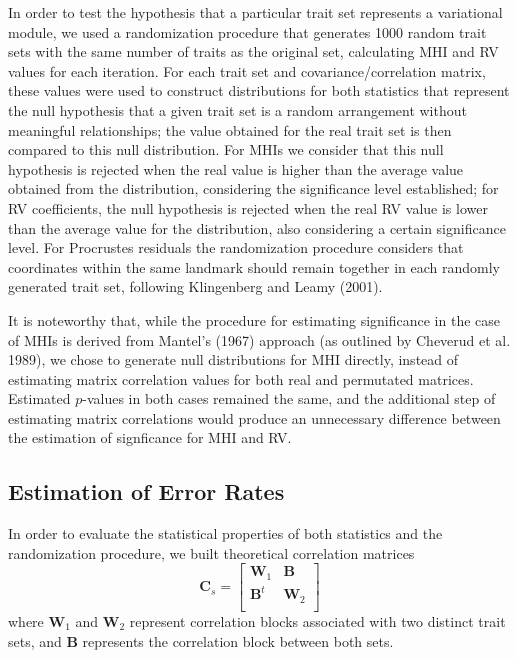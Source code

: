 \documentclass[12pt,]{article}
\begin{document}
In order to test the hypothesis that a particular trait set represents a
variational module, we used a randomization procedure that generates
1000 random trait sets with the same number of traits as the original
set, calculating MHI and RV values for each iteration. For each trait
set and covariance/correlation matrix, these values were used to
construct distributions for both statistics that represent the null
hypothesis that a given trait set is a random arrangement without
meaningful relationships; the value obtained for the real trait set is
then compared to this null distribution. For MHIs we consider that this
null hypothesis is rejected when the real value is higher than the
average value obtained from the distribution, considering the
significance level established; for RV coefficients, the null hypothesis
is rejected when the real RV value is lower than the average value for
the distribution, also considering a certain significance level. For
Procrustes residuals the randomization procedure considers that
coordinates within the same landmark should remain together in each
randomly generated trait set, following Klingenberg and Leamy (2001).

It is noteworthy that, while the procedure for estimating significance
in the case of MHIs is derived from Mantel's (1967) approach (as
outlined by Cheverud et al. 1989), we chose to generate null
distributions for MHI directly, instead of estimating matrix correlation
values for both real and permutated matrices. Estimated $p$-values in
both cases remained the same, and the additional step of estimating
matrix correlations would produce an unnecessary difference between the
estimation of signficance for MHI and RV.

\subsection{Estimation of Error Rates}\label{estimation-of-error-rates}

In order to evaluate the statistical properties of both statistics and
the randomization procedure, we built theoretical correlation matrices
\[
\mathbf{C}_{s} =
\begin{bmatrix}
\mathbf{W}_1 & \mathbf{B} \\
\mathbf{B}^t & \mathbf{W}_2 \\
\end{bmatrix}
\] where $\mathbf{W}_1$ and $\mathbf{W}_2$ represent correlation blocks
associated with two distinct trait sets, and $\mathbf{B}$ represents the
correlation block between both sets.
\end{document}
